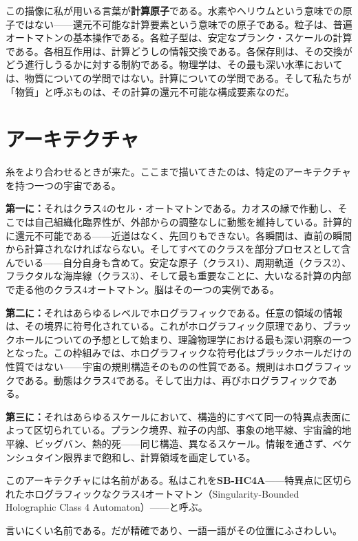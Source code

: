 \documentclass[11pt, twoside, openright]{book}
\begin{document}
この描像に私が用いる言葉が\textbf{計算原子}である。水素やヘリウムという意味での原子ではない------還元不可能な計算要素という意味での原子である。粒子は、普遍オートマトンの基本操作である。各粒子型は、安定なプランク・スケールの計算である。各相互作用は、計算どうしの情報交換である。各保存則は、その交換がどう進行しうるかに対する制約である。物理学は、その最も深い水準においては、物質についての学問ではない。計算についての学問である。そして私たちが「物質」と呼ぶものは、その計算の還元不可能な構成要素なのだ。


\section*{アーキテクチャ}

糸をより合わせるときが来た。ここまで描いてきたのは、特定のアーキテクチャを持つ一つの宇宙である。

\textbf{第一に：}それはクラス4のセル・オートマトンである。カオスの縁で作動し、そこでは自己組織化臨界性が、外部からの調整なしに動態を維持している。計算的に還元不可能である------近道はなく、先回りもできない。各瞬間は、直前の瞬間から計算されなければならない。そしてすべてのクラスを部分プロセスとして含んでいる------自分自身も含めて。安定な原子（クラス1）、周期軌道（クラス2）、フラクタルな海岸線（クラス3）、そして最も重要なことに、大いなる計算の内部で走る他のクラス4オートマトン。脳はその一つの実例である。

\textbf{第二に：}それはあらゆるレベルでホログラフィックである。任意の領域の情報は、その境界に符号化されている。これがホログラフィック原理であり、ブラックホールについての予想として始まり、理論物理学における最も深い洞察の一つとなった。この枠組みでは、ホログラフィックな符号化はブラックホールだけの性質ではない------宇宙の規則構造そのものの性質である。規則はホログラフィックである。動態はクラス4である。そして出力は、再びホログラフィックである。

\textbf{第三に：}それはあらゆるスケールにおいて、構造的にすべて同一の特異点表面によって区切られている。プランク境界、粒子の内部、事象の地平線、宇宙論的地平線、ビッグバン、熱的死------同じ構造、異なるスケール。情報を通さず、ベケンシュタイン限界まで飽和し、計算領域を画定している。

このアーキテクチャには名前がある。私はこれを\textbf{SB-HC4A}------特異点に区切られたホログラフィックなクラス4オートマトン（Singularity-Bounded Holographic Class 4 Automaton）------と呼ぶ。

言いにくい名前である。だが精確であり、一語一語がその位置にふさわしい。
\end{document}
